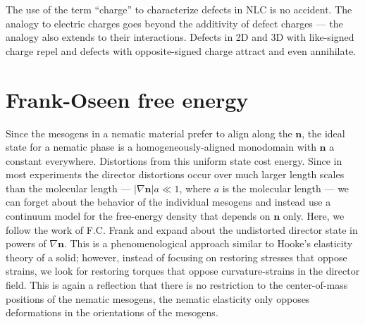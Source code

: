 The use of the term ``charge'' to characterize defects in NLC is no accident.
The analogy to electric charges goes beyond the additivity of defect charges --- the analogy also extends to their interactions.
Defects in 2D and 3D with like-signed charge repel and defects with opposite-signed charge attract and even annihilate.




\section{Frank-Oseen free energy}
Since the mesogens in a nematic material prefer to align along the $\mathbf{n}$, the ideal state for a nematic phase is a homogeneously-aligned monodomain with $\mathbf{n}$ a constant everywhere.
Distortions from this uniform state cost energy.
Since in most experiments the director distortions occur over much larger length scales than the molecular length --- $|\nabla \mathbf{n}| a \ll 1$, where $a$ is the molecular length --- we can forget about the behavior of the individual mesogens and instead use a continuum model for the free-energy density that depends on $\mathbf{n}$ only.
Here, we follow the work of F.C. Frank and expand about the undistorted director state in powers of $\nabla \mathbf{n}$.
This is a phenomenological approach similar to Hooke's elasticity theory of a solid; however, instead of focusing on restoring stresses that oppose strains, we look for restoring torques that oppose curvature-strains in the director field.
This is again a reflection that there is no restriction to the center-of-mass positions of the nematic mesogens, the nematic elasticity only opposes deformations in the orientations of the mesogens.

